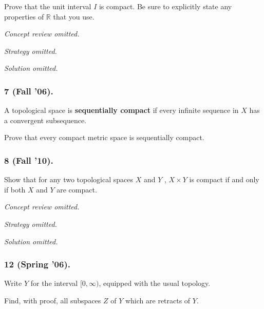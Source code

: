 \begin{problem}[Fall 2005]

Prove that the unit interval \(I\) is compact. Be sure to explicitly
state any properties of \({\mathbb{R}}\) that you use.

\end{problem}

\emph{Concept review omitted.}

\emph{Strategy omitted.}

\emph{Solution omitted.}

\hypertarget{fall-06.}{%
\subsubsection{7 (Fall '06).}\label{fall-06.}}

\begin{problem}[Fall 2006, 7]

A topological space is \textbf{sequentially compact} if every infinite
sequence in \(X\) has a convergent subsequence.

Prove that every compact metric space is sequentially compact.

\end{problem}

\hypertarget{fall-10.}{%
\subsubsection{8 (Fall '10).}\label{fall-10.}}

\begin{problem}[Fall 2010, 8]

Show that for any two topological spaces \(X\) and \(Y\) ,
\(X \times Y\) is compact if and only if both \(X\) and \(Y\) are
compact.

\end{problem}

\emph{Concept review omitted.}

\emph{Strategy omitted.}

\emph{Solution omitted.}

\hypertarget{spring-06.}{%
\subsubsection{12 (Spring '06).}\label{spring-06.}}

\begin{problem}[Spring 2006, 12]

Write \(Y\) for the interval \([0, \infty)\), equipped with the usual
topology.

Find, with proof, all subspaces \(Z\) of \(Y\) which are retracts of
\(Y\).

\end{problem}

